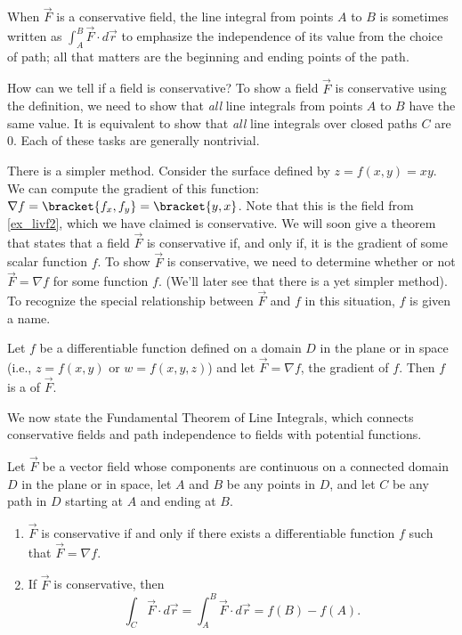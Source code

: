 When $\vec F$ is a conservative field, the line integral from points $A$ to $B$ is sometimes written as $\int_A^B\vec F\cdot d\vec r$ to emphasize the independence of its value from the choice of path; all that matters are the beginning and ending points of the path.

How can we tell if a field is conservative? To show a field $\vec F$ is conservative using the definition, we need to show that \emph{all} line integrals from points $A$ to $B$ have the same value. It is equivalent to show that \emph{all} line integrals over closed paths $C$ are 0. Each of these tasks are generally nontrivial.

There is a simpler method. Consider the surface defined by $z = f(x,y) = xy$. We can compute the gradient of this function: $\nabla f =\bracket{f_x, f_y}=\bracket{y, x}$. Note that this is the field from \autoref{ex_livf2}, which we have claimed is conservative. We will soon give a theorem that states that a field $\vec F$ is conservative if, and only if, it is the gradient of some scalar function $f$. To show $\vec F$ is conservative, we need to determine whether or not $\vec F = \nabla f$ for some function $f$. (We'll later see that there is a yet simpler method). To recognize the special relationship between $\vec F$ and $f$ in this situation, $f$ is given a name.

{Let $f$ be a differentiable function defined on a  domain $D$ in the plane or in space (i.e., $z = f(x,y)$ or $w = f(x,y,z)$) and let $\vec F = \nabla f$, the gradient of $f$. Then $f$ is a  of $\vec F$.
}

We now state the Fundamental Theorem of Line Integrals, which connects conservative fields and path independence to fields with potential functions. 

\begin{theorem}\label{thm:FTofLineIntegrals}
Let $\vec F$ be a vector field whose components are continuous on a connected domain $D$ in the plane or in space, let $A$ and $B$ be any points in $D$, and let $C$ be any path in $D$ starting at $A$ and ending at $B$.
\begin{enumerate}
	\item $\vec F$ is conservative if and only if there exists a differentiable function $f$ such that $\vec F = \nabla f$. 
	\item	If $\vec F$ is conservative, then 
	\[\int_C\vec F\cdot d\vec r = \int_A^B \vec F\cdot d\vec r = f(B) - f(A).\]
\end{enumerate}
\end{theorem}

